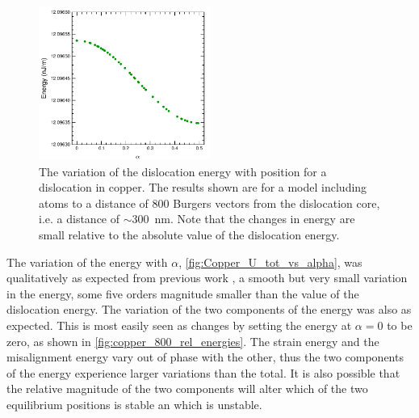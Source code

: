 \begin{figure}
\centering
\includegraphics[width=0.5\textwidth]{Copper_800_U_tot}
\caption[Energy variation of a dislocation in copper with the dislocation position.]{The variation of the dislocation energy with position for a dislocation in copper. The results shown are for a model including atoms to a distance of 800 Burgers vectors from the dislocation core, i.e. a distance of $\sim$\SI{300}{\nano\metre}.  Note that the changes in energy are small relative to the absolute value of the dislocation energy.\label{fig:Copper_U_tot_vs_alpha}}
\end{figure}

The variation of the energy with $\alpha$, \autoref{fig:Copper_U_tot_vs_alpha}, was qualitatively as expected from previous work \cite{Bulatov1997,Clegg2006}, a smooth but very small variation in the energy, some five orders magnitude smaller than the value of the dislocation energy. The variation of the two components of the energy was also as expected. This is most easily seen as changes by setting the energy at $\alpha=0$ to be zero, as shown in \autoref{fig:copper_800_rel_energies}. The strain energy and the misalignment energy vary out of phase with the other, thus the two components of the energy experience larger variations than the total. It is also possible that the relative magnitude of the two components will alter which of the two equilibrium positions is stable an which is unstable.


